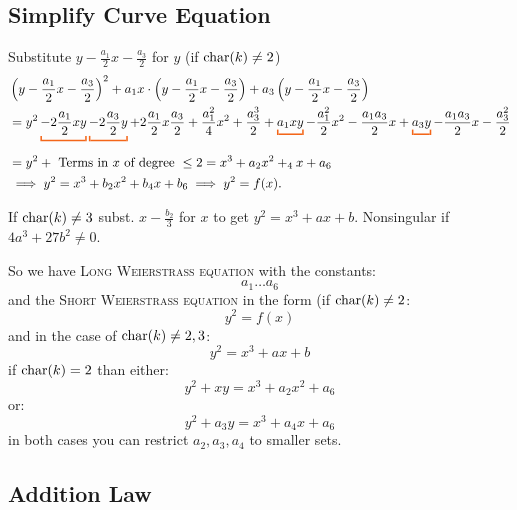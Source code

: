 \subsection{Simplify Curve Equation}

Substitute $y-\frac{a_1}{2}x - \frac{a_3}{2}$ for $y$ (if $\operatorname{char}(k) \neq 2$)
\begin{align*}
&\left(y-\frac{a_1}{2}x - \frac{a_3}{2}\right)^2 + a_1x \cdot \left(y-\frac{a_1}{2}x - \frac{a_3}{2}\right) + a_3 \left(y-\frac{a_1}{2}x - \frac{a_3}{2}\right) \\
&=y^2\colub{-2 \frac{a_1}{2}xy}_{} \colub{-2\frac{a_3}{2}y}_{} + 2 \frac{a_1}{2} x \frac{a_3}{2} + \frac{a_1^2}{4}x^2 + \frac{a_3^3}{2} + \colub{a_1xy}_{} - \frac{a_1^2}{2} x^2 - \frac{a_1a_3}{2}x +\colub{a_3y}_{} - \frac{a_1a_3}{2} x - \frac{a_3^2}{2} \\
&=y^2 + \text{ Terms in $x$  of degree } \leq 2 = x^3 + a_2x^2 + _4x + a_6\\
&\implies y^2 = x^3 + b_2x^2 + b_4x + b_6 \implies y^2 = f(x).
\end{align*}

If $\operatorname{char}(k) \neq 3$ subst. $x-\frac{b_2}{3}$ for $x$ to get $y^2=x^3 + ax + b$. Nonsingular if $4a^3 + 27b^2 \neq 0$.

So we have \textsc{Long Weierstrass equation} with the constants:
\[
a_1 \dots a_6
\]
and the \textsc{Short Weierstrass equation} in the form (if $\operatorname{char}(k) \neq 2$:
\[
y^2 = f(x)
\]
and in the case of $\operatorname{char}(k) \neq 2,3$:
\[
y^2 = x^3 + ax + b
\]
if $\operatorname{char}(k) = 2$ than either:
\[
y^2 + xy= x^3+a_2x^2 + a_6
\]
or:
\[
y^2 + a_3y = x^3 + a_4x + a_6
\]
in both cases you can restrict $a_2, a_3, a_4$ to smaller sets.

\subsection{Addition Law}

